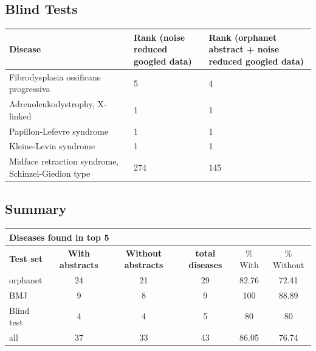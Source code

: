 \documentclass[10pt,letterpaper,final]{article}
\begin{document}
\subsection{Blind Tests}
\label{app:blind_with_without}
\begin{center}
\begin{small}
	\begin{tabular}{|p{6cm}|p{2.5cm}|p{2.5cm}|}
	\hline
	\textbf{Disease}  & \textbf{Rank (noise reduced googled data)} & \textbf{Rank (orphanet abstract + noise reduced googled data)} \\
	\hline\hline
Fibrodysplasia ossificans progressiva   &  5 & 4 \\ \hline
Adrenoleukodystrophy, X-linked          &  1 & 1 \\ \hline
Papillon-Lefevre syndrome               &  1 & 1 \\ \hline
Kleine-Levin syndrome                   &  1 & 1 \\ \hline
Midface retraction syndrome, Schinzel-Giedion type  & 274  & 145 \\ \hline
	\end{tabular}
\end{small}
\end{center}


\subsection{Summary}
\label{app:summary_with_without}

\begin{center}
\begin{small}
\begin{tabular}{l|cc||ccc}
	\multicolumn{6}{l}{\textbf{Diseases found in top 5}} \\ \hline
\textbf{Test set} & \textbf{With abstracts} &	\textbf{Without abstracts}	 &	\textbf{total diseases} &	\% With &\% Without \\ \hline
orphanet    &   24    &  21    &  29     & 82.76     & 72.41 \\
BMJ	        &    9   &   8   &     9  &    100  & 88.89 \\
Blind test	&    4   &   4   &     5  &    80  & 80 \\ \hline \hline
all	        &    37   & 33     &   43    &  86.05    & 76.74 \\ \hline
\end{tabular}
\end{small}
\end{center}
\end{document}
